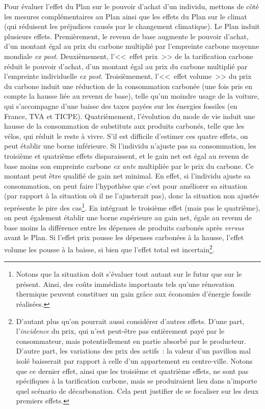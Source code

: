 \documentclass[a5paper,french,openany]{memoir}
\begin{document}
Pour évaluer l'effet du Plan sur le pouvoir d'achat d'un individu, mettons de côté les mesures complémentaires au Plan ainsi que les effets du Plan sur le climat (qui réduisent les préjudices causés par le changement climatique). Le Plan induit plusieurs effets. Premièrement, le revenu de base augmente le pouvoir d'achat, d'un montant égal au prix du carbone multiplié par l'empreinte carbone moyenne mondiale \textit{ex post}. Deuxièmement, l'<<~effet prix~>> de la tarification carbone réduit le pouvoir d'achat, d'un montant égal au prix du carbone multiplié par l'empreinte individuelle \textit{ex post}. Troisièmement, l'<<~effet volume~>> du prix du carbone induit une réduction de la consommation carbonée (une fois pris en compte la hausse liée au revenu de base), telle qu'un moindre usage de la voiture, qui s'accompagne d'une baisse des taxes payées sur les énergies fossiles (en France, TVA et TICPE). Quatrièmement, l'évolution du mode de vie induit une hausse de la consommation de substituts aux produits carbonés, telle que les vélos, qui réduit le reste à vivre. S'il est difficile d'estimer ces quatre effets, on peut établir une borne inférieure. Si l'individu n'ajuste pas sa consommation, les troisième et quatrième effets disparaissent, et le gain net est égal au revenu de base moins son empreinte carbone \textit{ex ante} multipliée par le prix du carbone. Ce montant peut être qualifié de gain net minimal. En effet, si l'individu ajuste sa consommation, on peut faire l'hypothèse que c'est pour améliorer sa situation (par rapport à la situation où il ne l'ajusterait pas), donc la situation non ajustée représente le pire des cas\footnote{Notons que la situation doit s'évaluer tout autant sur le futur que sur le présent. Ainsi, des coûts immédiats importants tels qu'une rénovation thermique peuvent constituer un gain grâce aux économies d'énergie fossile réalisées.}. En intégrant le troisième effet (mais pas le quatrième), on peut également établir une borne supérieure au gain net, égale au revenu de base moins la différence entre les dépenses de produits carbonés après \textit{versus} avant le Plan. 
Si l'effet prix pousse les dépenses carbonées à la hausse, l'effet volume les pousse à la baisse, si bien que l'effet total est incertain\footnote{D'autant plus qu'on pourrait aussi considérer d'autres effets. D'une part, l'\textit{incidence} du prix, qui n'est peut-être pas entièrement payé par le consommateur, mais potentiellement en partie absorbé par le producteur. D'autre part, les variations des prix des actifs~: la valeur d'un pavillon mal isolé baisserait par rapport à celle d'un appartement en centre-ville. Notons que ce dernier effet, ainsi que les troisième et quatrième effets, ne sont pas spécifiques à la tarification carbone, mais se produiraient lieu dans n'importe quel scénario de décarbonation. Cela peut justifier de se focaliser sur les deux premiers effets.}. 
\end{document}

